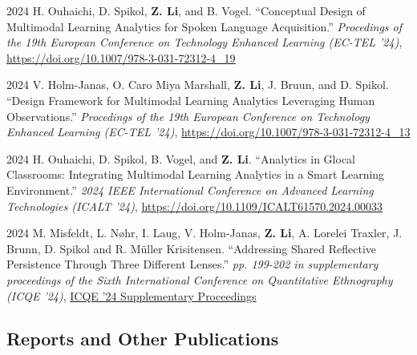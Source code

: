 \documentclass[11pt,letterpaper]{report}
\begin{document}
\begin{tablist}
        \item[2024] \tab{} H. Ouhaichi, D. Spikol, \textbf{Z. Li}, and B. Vogel. \enquote{Conceptual Design of Multimodal Learning Analytics for Spoken Language Acquisition.} \textit{Procedings of the 19th European Conference on Technology Enhanced Learning (EC-TEL '24)}, \href{https://doi.org/10.1007/978-3-031-72312-4_19}{https://doi.org/10.1007/978-3-031-72312-4\_19}
        \item[2024] \tab{} V. Holm-Janas, O. Caro Miya Marshall, \textbf{Z. Li}, J. Bruun, and D. Spikol. \enquote{Design Framework for Multimodal Learning Analytics Leveraging Human Observations.} \textit{Procedings of the 19th European Conference on Technology Enhanced Learning (EC-TEL '24)}, \href{https://doi.org/10.1007/978-3-031-72312-4_13}{https://doi.org/10.1007/978-3-031-72312-4\_13}
        \item[2024] \tab{} H. Ouhaichi, D. Spikol, B. Vogel, and \textbf{Z. Li}. \enquote{Analytics in Glocal Classrooms: Integrating Multimodal Learning Analytics in a Smart Learning Environment.} \textit{2024 IEEE International Conference on Advanced Learning Technologies (ICALT '24)}, \href{https://doi.org/10.1109/ICALT61570.2024.00033}{https://doi.org/10.1109/ICALT61570.2024.00033}
        \item[2024] \tab{} M. Misfeldt, L. Nøhr, I. Laug, V. Holm-Janas, \textbf{Z. Li}, A. Lorelei Traxler, J. Brunn, D. Spikol and R. Müller Krisitensen. \enquote{Addressing Shared Reflective Persistence Through Three Different Lenses.} \textit{pp. 199-202 in supplementary proceedings of the Sixth International Conference on Quantitative Ethnography (ICQE '24)}, \href{https://www.qesoc.org/images/pdf/ICQE24_Supplement_Proceedings.pdf}{ICQE '24 Supplementary Proceedings}

    \end{tablist}



    \subsection*{Reports and Other Publications}
\end{document}
